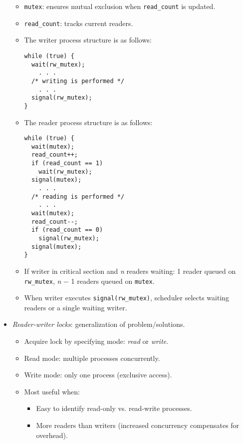 \begin{itemize}
\begin{itemize}
        \item \texttt{mutex}: ensures mutual exclusion when \texttt{read\_count} is updated.
        \item \texttt{read\_count}: tracks current readers.
        \item The writer process structure is as follows:
        \begin{verbatim}
while (true) {
  wait(rw_mutex);
    . . .
  /* writing is performed */
    . . .
  signal(rw_mutex);
}
        \end{verbatim}
        \item The reader process structure is as follows:
        \begin{verbatim}
while (true) {
  wait(mutex);
  read_count++;
  if (read_count == 1)
    wait(rw_mutex);
  signal(mutex);
    . . .
  /* reading is performed */
    . . .
  wait(mutex);
  read_count--;
  if (read_count == 0)
    signal(rw_mutex);
  signal(mutex);
}
        \end{verbatim}
        \item If writer in critical section and \textit{n} readers waiting: 1 reader queued on \texttt{rw\_mutex}, \textit{n} $-$ 1 readers queued on \texttt{mutex}.
        \item When writer executes \texttt{signal(rw\_mutex)}, scheduler selects waiting readers or a single waiting writer.
    \end{itemize}
    \item \textit{Reader-writer locks}: generalization of problem/solutions.
    \begin{itemize}
        \item Acquire lock by specifying mode: \textit{read} or \textit{write}.
        \item Read mode: multiple processes concurrently.
        \item Write mode: only one process (exclusive access).
        \item Most useful when:
        \begin{itemize}
            \item Easy to identify read-only vs. read-write processes.
            \item More readers than writers (increased concurrency compensates for overhead).
        \end{itemize}
    \end{itemize}
\end{itemize}

